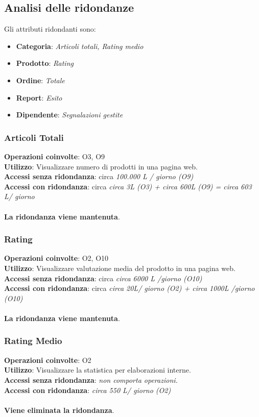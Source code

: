 \subsection{Analisi delle ridondanze}

Gli attributi ridondanti sono:
\begin{itemize}
    \item \textbf{Categoria}: \textit{Articoli totali, Rating medio}
    \item \textbf{Prodotto}: \textit{Rating}
    \item \textbf{Ordine}: \textit{Totale}
    \item \textbf{Report}: \textit{Esito}
    \item \textbf{Dipendente}: \textit{Segnalazioni gestite}
\end{itemize}

\subsubsection{Articoli Totali}
\textbf{Operazioni coinvolte}: O3, O9\\
\textbf{Utilizzo}: Visualizzare numero di prodotti in una pagina web.\\
\textbf{Accessi senza ridondanza}: circa \textit{100.000 L / giorno (O9) }\\
\textbf{Accessi con ridondanza}: circa \textit{circa 3L (O3) + circa 600L (O9)  = circa 603 L/ giorno}\\\\
\textbf{La ridondanza viene mantenuta}.

\subsubsection{Rating}
\textbf{Operazioni coinvolte}: O2, O10  \\
\textbf{Utilizzo}: Visualizzare valutazione media del prodotto in una pagina web.\\
\textbf{Accessi senza ridondanza}: circa \textit{circa 6000 L /giorno (O10)}\\
\textbf{Accessi con ridondanza}: circa \textit{circa 20L/ giorno (O2) + circa  1000L /giorno (O10)}\\\\
\textbf{La ridondanza viene mantenuta}.

\subsubsection{Rating Medio}
\textbf{Operazioni coinvolte}: O2\\
\textbf{Utilizzo}: Visualizzare la statistica per elaborazioni interne.\\
\textbf{Accessi senza ridondanza}: \textit{non comporta operazioni.}\\
\textbf{Accessi con ridondanza}: \textit{circa 550 L/ giorno (O2)}\\\\
\textbf{Viene eliminata la ridondanza}.

